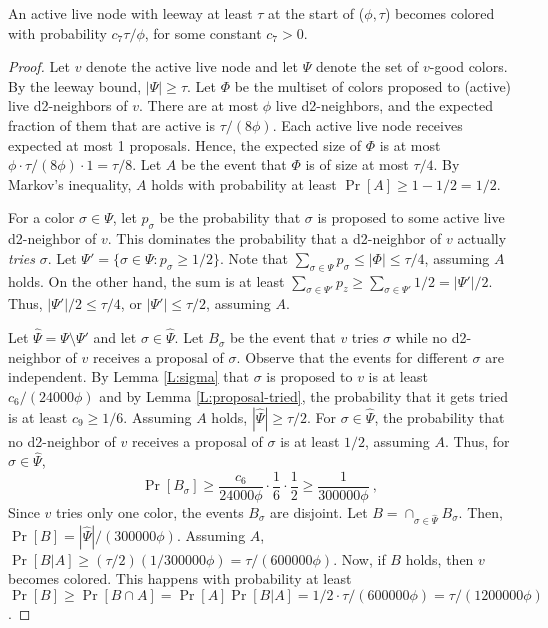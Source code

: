 \begin{lemma}
An active live node with leeway at least $\tau$ at the start of ($\phi,\tau$) becomes colored with probability $c_7 \tau/\phi$, for some constant $c_7 > 0$.
\label{L:progress}
\end{lemma}
\begin{proof}
Let $v$ denote the active live node and let $\Psi$ denote the set of $v$-good colors. By the leeway bound, $|\Psi| \ge \tau$. 
Let $\Phi$ be the multiset of colors proposed to (active) live d2-neighbors of $v$.
There are at most $\phi$ live d2-neighbors, and the expected fraction of them that are active is $\tau/(8\phi)$. Each active live node receives expected at most 1 proposals. Hence, the expected size of $\Phi$ is at most $\phi \cdot \tau/(8\phi) \cdot 1 = \tau/8$.
Let $A$ be the event that $\Phi$ is of size at most $\tau/4$. By Markov's inequality, $A$ holds with probability at least $\Pr[A] \ge 1-1/2 = 1/2$.

For a color $\sigma \in \Psi$, let $p_\sigma$ be the probability that $\sigma$ is proposed to some active live d2-neighbor of $v$. This dominates the probability that a d2-neighbor of $v$ actually \emph{tries} $\sigma$. 
Let $\Psi' = \{\sigma \in \Psi : p_{\sigma} \ge 1/2\}$. 
Note that $\sum_{\sigma \in \Psi} p_{\sigma} \le |\Phi| \le \tau/4$, assuming $A$ holds. 
On the other hand, the sum is at least $\sum_{\sigma \in \Psi'} p_{z} \ge \sum_{\sigma \in \Psi'} 1/2 = |\Psi'|/2$. Thus, $|\Psi'|/2 \le \tau/4$, or $|\Psi'| \le \tau/2$, assuming $A$.

Let $\hat{\Psi} = \Psi \setminus \Psi'$ and let $\sigma \in \hat{\Psi}$. Let $B_\sigma$ be the event that $v$ tries $\sigma$ while no d2-neighbor of $v$ receives a proposal of $\sigma$. Observe that the events for different $\sigma$ are independent.
By Lemma \ref{L:sigma} that $\sigma$ is proposed to $v$ is at least $c_6/(24000\phi)$ and by Lemma \ref{L:proposal-tried}, the probability that it gets tried is at least $c_9 \ge 1/6$. 
Assuming $A$ holds, $|\hat{\Psi}| \ge \tau/2$.
For $\sigma \in \hat{\Psi}$, the probability that no d2-neighbor of $v$ receives a proposal of $\sigma$ is at least $1/2$, assuming $A$.
Thus, for $\sigma \in \hat{\Psi}$,
\[ \Pr[B_\sigma] \ge \frac{c_6}{24000\phi} \cdot \frac{1}{6} \cdot \frac{1}{2} \ge \frac{1}{300000 \phi}\ , \]
Since $v$ tries only one color, the events $B_\sigma$ are disjoint.
Let $B = \cap_{\sigma \in \hat{\Psi}} B_\sigma$.
Then, $\Pr[B] = |\hat{\Psi}|/(300000\phi)$. 
Assuming $A$, $\Pr[B|A] \ge (\tau/2)(1/300000\phi) = \tau/(600000\phi)$.
Now, if $B$ holds, then $v$ becomes colored.
This happens with probability at least
$\Pr[B] \ge \Pr[B \cap A] = \Pr[A] \Pr[B|A] = 1/2 \cdot \tau/(600000\phi) = \tau/(1200000\phi)$.
\end{proof}

